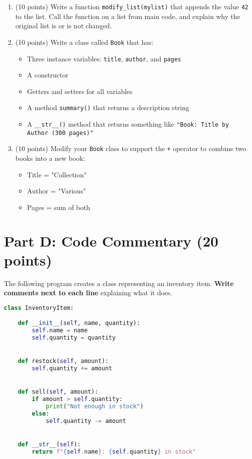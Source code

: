 \documentclass[11pt]{article}
\begin{document}
\begin{enumerate}[label=\arabic*.]
    \item (10 points) Write a function \verb|modify_list(mylist)| that appends the value \verb|42| to the list. Call the function on a list from main code, and explain why the original list is or is not changed.

    \vspace{20cm}

    \item (10 points) Write a class called \verb|Book| that has:
    \begin{itemize}
        \item Three instance variables: \verb|title|, \verb|author|, and \verb|pages|
        \item A constructor
        \item Getters and setters for all variables
        \item A method \verb|summary()| that returns a description string
        \item A \verb|__str__()| method that returns something like \verb|"Book: Title by Author (300 pages)"|
    \end{itemize}

    \vspace{20cm}

    \item (10 points) Modify your \verb|Book| class to support the \verb|+| operator to combine two books into a new book:
    \begin{itemize}
        \item Title = "Collection"
        \item Author = "Various"
        \item Pages = sum of both
    \end{itemize}

    \vspace{8cm}
\end{enumerate}

\newpage

\section*{Part D: Code Commentary (20 points)}  
The following program creates a class representing an inventory item. \textbf{Write comments next to each line} explaining what it does.

\begin{lstlisting}[language=Python]
class InventoryItem:

    def __init__(self, name, quantity):
        self.name = name
        self.quantity = quantity


    def restock(self, amount):
        self.quantity += amount


    def sell(self, amount):
        if amount > self.quantity:
            print("Not enough in stock")
        else:
            self.quantity -= amount


    def __str__(self):
        return f"{self.name}: {self.quantity} in stock"
\end{lstlisting}
\end{document}
